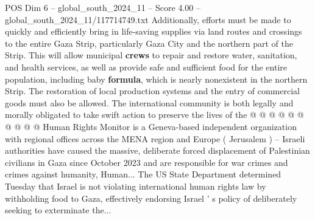 \begin{textsample}{POS Dim 6 – global\_south\_2024\_11 – Score 4.00 – global\_south\_2024\_11/117714749.txt}
Additionally, efforts must be made to quickly and efficiently bring in life-saving supplies via land routes and crossings to the entire Gaza Strip, particularly Gaza City and the northern part of the Strip.
This will allow municipal \textbf{crews} to repair and restore water, sanitation, and health services, as well as provide safe and sufficient food for the entire population, including baby \textbf{formula}, which is nearly nonexistent in the northern Strip.
The restoration of local production systems and the entry of commercial goods must also be allowed.
The international community is both legally and morally obligated to take swift action to preserve the lives of the @ @ @ @ @ @ @ @ @ @ Human Rights Monitor is a Geneva-based independent organization with regional offices across the MENA region and Europe ( Jerusalem ) -- Israeli authorities have caused the massive, deliberate forced displacement of Palestinian civilians in Gaza since October 2023 and are responsible for war crimes and crimes against humanity, Human...
The US State Department determined Tuesday that Israel is not violating international human rights law by withholding food to Gaza, effectively endorsing Israel ' s policy of deliberately seeking to exterminate the...

\end{textsample}
